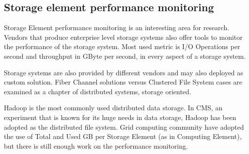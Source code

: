 \subsection{Storage element performance monitoring}

Storage Element performance monitoring is an interesting area for research. Vendors that produce enterprise level storage systems also offer tools to monitor the performance of the storage system. Most used metric is I/O Operations per second and throughput in GByte per second, in every aspect of a storage system.

Storage systems are also provided by different vendors and may also deployed as custom solution. Fiber Channel solutions versus Clustered File System cases are examined \cite{brzezniak2008analysis} as a chapter of distributed systems, storage oriented.

Hadoop is the most commonly used distributed data storage. In CMS, an experiment that is known for its huge needs in data storage, Hadoop has been adopted \cite{hadoop} as the distributed file system. Grid computing community have adopted the use of Total and Used GB per Storage Element (as in Computing Element), but there is still enough work on the performance monitoring.
